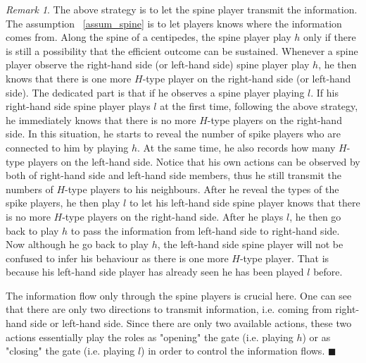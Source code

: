 \documentclass[12pt,letter]{article}
\theoremstyle{remark}
\theoremstyle{remark}
\newtheorem*{remark}{Remark}
\theoremstyle{claim}
\begin{document}
\begin{remark}
The above strategy is to let the spine player transmit the information. The assumption ~\ref{assum_spine} is to let players knows where the information comes from. Along the spine of a centipedes, the spine player play $h$ only if there is still a possibility that the efficient outcome can be sustained. Whenever a spine player observe the right-hand side (or left-hand side) spine player play $h$, he then knows that there is one more $H$-type player on the right-hand side (or left-hand side). The dedicated part is that if he observes a spine player playing $l$. If his right-hand side spine player plays $l$ at the first time, following the above strategy, he immediately knows that there is no more $H$-type players on the right-hand side. In this situation, he starts to reveal the number of spike players who are connected to him by playing $h$. At the same time, he also records how many $H$-type players on the left-hand side. Notice that his own actions can be observed by both of right-hand side and left-hand side members, thus he still transmit the numbers of $H$-type players to his neighbours. After he reveal the types of the spike players, he then play $l$ to let his left-hand side spine player knows that there is no more $H$-type players on the right-hand side. After he plays $l$, he then go back to play $h$ to pass the information from left-hand side to right-hand side. Now although he go back to play $h$, the left-hand side spine player will not be confused to infer his behaviour as there is one more $H$-type player. That is because his left-hand side player has already seen he has been played $l$ before. 

The information flow only through the spine players is crucial here. One can see that there are only two directions to transmit information, i.e. coming from right-hand side or left-hand side. Since there are only two available actions, these two actions essentially play the roles as "opening" the gate (i.e. playing $h$) or as "closing" the gate (i.e. playing $l$) in order to control the information flows. $\blacksquare$
\end{remark}
\end{document}

